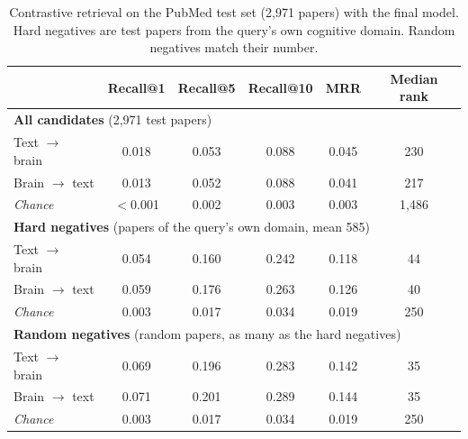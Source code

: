 \begin{table}[ht]
\centering
\small
\caption{Contrastive retrieval on the PubMed test set (2,971 papers) with the final model. Hard negatives are test papers from the query's own cognitive domain. Random negatives match their number.}
\label{tab:retrieval_metrics}
\begin{tabular}{lccccc}
\toprule
 & Recall@1 & Recall@5 & Recall@10 & MRR & Median rank \\
\midrule
\multicolumn{6}{l}{\textbf{All candidates} (2,971 test papers)} \\
\quad Text $\rightarrow$ brain & 0.018 & 0.053 & 0.088 & 0.045 & 230 \\
\quad Brain $\rightarrow$ text & 0.013 & 0.052 & 0.088 & 0.041 & 217 \\
\quad \textit{Chance} & $<$0.001 & 0.002 & 0.003 & 0.003 & 1,486 \\
\midrule
\multicolumn{6}{l}{\textbf{Hard negatives} (papers of the query's own domain, mean 585)} \\
\quad Text $\rightarrow$ brain & 0.054 & 0.160 & 0.242 & 0.118 & 44 \\
\quad Brain $\rightarrow$ text & 0.059 & 0.176 & 0.263 & 0.126 & 40 \\
\quad \textit{Chance} & 0.003 & 0.017 & 0.034 & 0.019 & 250 \\
\midrule
\multicolumn{6}{l}{\textbf{Random negatives} (random papers, as many as the hard negatives)} \\
\quad Text $\rightarrow$ brain & 0.069 & 0.196 & 0.283 & 0.142 & 35 \\
\quad Brain $\rightarrow$ text & 0.071 & 0.201 & 0.289 & 0.144 & 35 \\
\quad \textit{Chance} & 0.003 & 0.017 & 0.034 & 0.019 & 250 \\
\bottomrule
\end{tabular}
\end{table}
